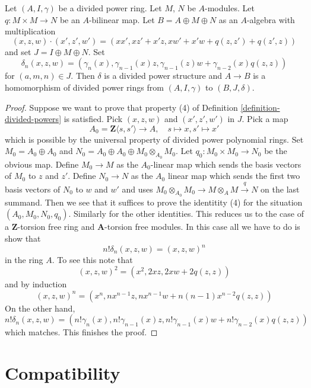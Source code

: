 \begin{lemma}
\label{lemma-divided-power-second-order-thickening}
Let $(A, I, \gamma)$ be a divided power ring. Let $M$, $N$ be $A$-modules.
Let $q : M \times M \to N$ be an $A$-bilinear map.
Let $B = A \oplus M \oplus N$ as an $A$-algebra with multiplication
$$
(x, z, w)\cdot (x', z', w') = (xx', xz' + x'z, xw' + x'w + q(z, z') + q(z', z))
$$
and set $J = I \oplus M \oplus N$. Set
$$
\delta_n(x, z, w) = (\gamma_n(x), \gamma_{n - 1}(x)z,
\gamma_{n - 1}(z)w + \gamma_{n - 2}(x)q(z, z))
$$
for $(a, m, n) \in J$.
Then $\delta$ is a divided power structure and
$A \to B$ is a homomorphism of divided power rings from
$(A, I, \gamma)$ to $(B, J, \delta)$.
\end{lemma}

\begin{proof}
Suppose we want to prove that property (4) of
Definition \ref{definition-divided-powers}
is satisfied. Pick $(x, z, w)$ and $(x', z', w')$ in $J$.
Pick a map
$$
A_0 = \mathbf{Z}\langle s, s'\rangle \longrightarrow A,\quad
s \longmapsto x,
s' \longmapsto x'
$$
which is possible by the universal property of divided power
polynomial rings. Set $M_0 = A_0 \oplus A_0$ and
$N_0 = A_0 \oplus A_0 \oplus M_0 \otimes_{A_0} M_0$.
Let $q_0 : M_0 \times M_0 \to N_0$ be the obvious map.
Define $M_0 \to M$ as the $A_0$-linear map which sends
the basis vectors of $M_0$ to $z$ and $z'$. Define $N_0 \to N$
as the $A_0$ linear map which sends the first two basis vectors
of $N_0$ to $w$ and $w'$ and uses
$M_0 \otimes_{A_0} M_0 \to M \otimes_A M \xrightarrow{q} N$
on the last summand. Then we see that it suffices to prove the
identitity (4) for the situation $(A_0, M_0, N_0, q_0)$.
Similarly for the other identities. This reduces us to the case
of a $\mathbf{Z}$-torsion free ring and $\mathbf{A}$-torsion free modules.
In this case all we have to do is show that
$$
n! \delta_n(x, z, w) = (x, z, w)^n
$$
in the ring $A$. To see this note that
$$
(x, z, w)^2 = (x^2, 2xz, 2xw + 2q(z, z))
$$
and by induction
$$
(x, z, w)^n = (x^n, nx^{n - 1}z, nx^{n - 1}w + n(n - 1)x^{n - 2}q(z, z))
$$
On the other hand,
$$
n! \delta_n(x, z, w) = (n!\gamma_n(x), n!\gamma_{n - 1}(x)z,
n!\gamma_{n - 1}(x)w + n!\gamma_{n - 2}(x) q(z, z))
$$
which matches. This finishes the proof.
\end{proof}




\section{Compatibility}
\label{section-compatibility}

